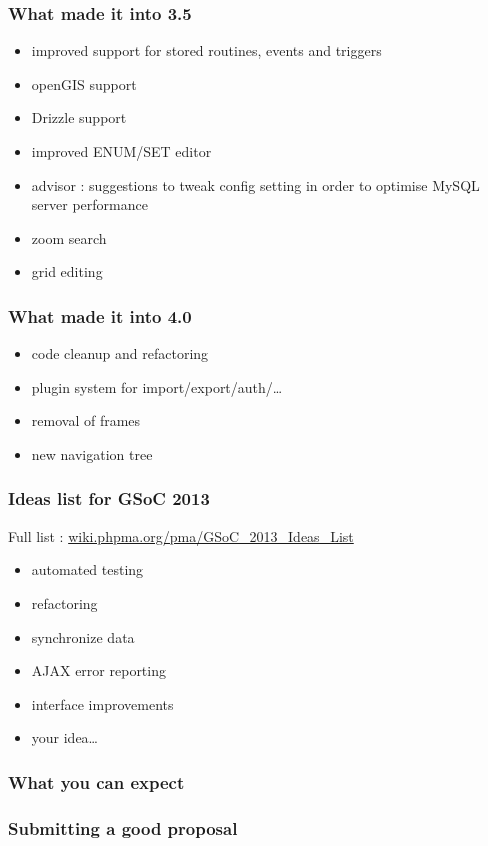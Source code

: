 \documentclass[14pt]{beamer}
\begin{document}
  \begin{frame}
    \frametitle{What made it into 3.5}
    \begin{itemize}
      \item improved support for stored routines, events and triggers
      \item openGIS support
      \item Drizzle support
      \item improved ENUM/SET editor
      \item advisor : suggestions to tweak config setting in order to optimise MySQL server performance
      \item zoom search
      \item grid editing
    \end{itemize}
  \end{frame}
  \begin{frame}
    \frametitle{What made it into 4.0}
    \begin{itemize}
      \item code cleanup and refactoring
      \item plugin system for import/export/auth/\ldots
      \item removal of frames
      \item new navigation tree
    \end{itemize}
  \end{frame}
  \begin{frame}
    \frametitle{Ideas list for GSoC 2013}
    Full list : \href{http://wiki.phpma.org/pma/GSoC\_2013\_Ideas\_List}{wiki.phpma.org/pma/GSoC\_2013\_Ideas\_List}
    \begin{itemize}
      \item automated testing
      \item refactoring
      \item synchronize data
      \item AJAX error reporting
      \item interface improvements
      \item your idea\ldots
    \end{itemize}
  \end{frame}
  \begin{frame}
    \frametitle{What you can expect}
  \end{frame}
  \begin{frame}
    \frametitle{Submitting a good proposal}
  \end{frame}
\end{document}
